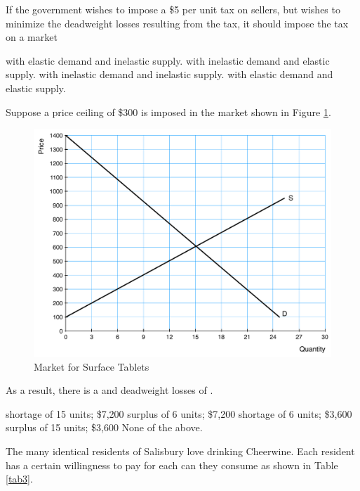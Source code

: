 \documentclass[addpoints,11pt]{exam}
\theoremstyle{definition}
\begin{document}
\begin{questions}
	\question If the government wishes to impose a \$5 per unit tax on sellers, but wishes to minimize the deadweight losses resulting from the tax, it should impose the tax on a market 
	
	\begin{choices}
		\choice with elastic demand and inelastic supply.
		\choice with inelastic demand and elastic supply.
		\CorrectChoice with inelastic demand and inelastic supply.
		\choice with elastic demand and elastic supply.
	\end{choices}
	
	\question Suppose a price ceiling of \$300 is imposed in the market shown in Figure \ref{MC42}.
	
	
	\begin{figure}[H]
		\centering
		\includegraphics[scale=.40]{Final_MC42.pdf}
		\caption{Market for Surface Tablets}
		\label{MC42}
	\end{figure}
	
	As a result, there is a \underline{\hspace{3cm}} and deadweight losses of \underline{\hspace{3cm}}.
	
	\begin{choices}
		\choice shortage of 15 units; \$7,200
		\choice surplus of 6 units; \$7,200
		\choice shortage of 6 units; \$3,600
		\choice surplus of 15 units; \$3,600
		\CorrectChoice None of the above.
	\end{choices}
	

	
	\question The many identical residents of Salisbury love drinking Cheerwine. Each resident has a certain willingness to pay for each can they consume as shown in Table \ref{tab3}.
	

\end{questions}
\end{document}
